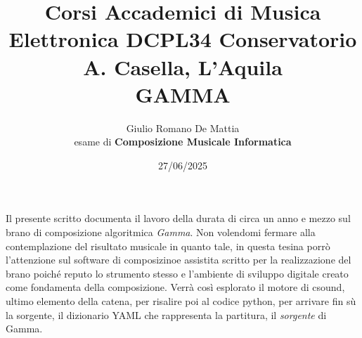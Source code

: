 \documentclass[a4paper,12pt]{article}
\title{Corsi Accademici di Musica Elettronica DCPL34 Conservatorio A. Casella, L'Aquila \\ \fontsize{14}{17}\bfseries\uppercase{Gamma}}
\author{Giulio Romano De Mattia \\ esame di \bfseries{Composizione Musicale Informatica} }
\date{27/06/2025}
\begin{document}
\maketitle
\thispagestyle{empty}

\begin{center}
    \vspace{1cm}
    \textbf{\fontsize{12}{15}\selectfont{Sommario}}
\end{center}

Il presente scritto documenta il lavoro della durata di circa un anno e mezzo sul brano di composizione algoritmica \textit{Gamma}. Non volendomi fermare 
alla contemplazione del risultato musicale in quanto tale, in questa tesina porrò l'attenzione sul software di composizinoe assistita scritto per la realizzazione 
del brano poiché reputo lo strumento stesso e l'ambiente di sviluppo digitale creato come fondamenta della composizione. 
Verrà così esplorato il motore di csound, ultimo elemento della catena, per risalire poi al codice python, per arrivare fin sù la sorgente, il dizionario YAML che rappresenta la partitura, il \textit{sorgente} di Gamma.


\newpage
\tableofcontents  

\newpage



%
%
\end{document}
